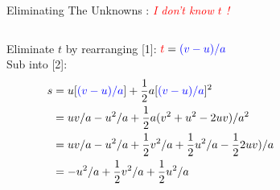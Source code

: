 \begin{frame}{ Eliminating The Unknowns  : \textit{\textcolor{red}{I don't know $t$ !} }}
\small
\begin{columns}[T]
\begin{column}{0.7\textwidth}
 Eliminate $t$ by rearranging [1]: $\textcolor{red}{t}= \textcolor{blue}{ (v-u) / a}$\\[1ex]
Sub into [2]: 
\notsotiny
\begin{equation}\nonumber
\begin{split}
s &= u  [\textcolor{blue}{ (v-u) / a}]+ \frac{1}{2} a [\textcolor{blue}{ (v-u) / a}]^2  \\
   &= uv/a -u^2/a + \frac{1}{2} a (v^2 + u^2 -2uv) / a^2 \\
  &= uv/a -u^2/a + \frac{1}{2} v^2/a +  \frac{1}{2}u^2/a - \frac{1}{2}2uv)/a \\
 & = -u^2/a + \frac{1}{2} v^2/a +  \frac{1}{2}u^2/a\\[1ex]
\end{split}
\end{equation}
\end{column}\hfill

\begin{column}{0.3\textwidth}
       
 \\[1ex] 
 \\[3ex] 
\end{column}
\end{columns}

\vspace{0.5cm}

  \\[1ex]



\end{frame}



